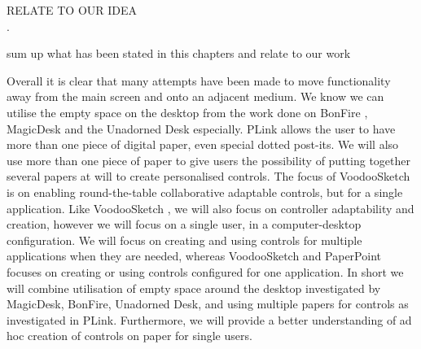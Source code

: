 RELATE TO OUR IDEA \\
.
\par






sum up what has been stated in this chapters and relate to our work


Overall it is clear that many attempts have been made to move functionality away from the main screen and onto an adjacent medium. We know we can utilise the empty space on the desktop from the work done on BonFire \cite{kane2009bonfire}, MagicDesk \cite{bi2011magic} and the Unadorned Desk \cite{hausen2012unadorned} especially. PLink \cite{steimle2011plink} allows the user to have more than one piece of digital paper, even special dotted post-its. We will also use more than one piece of paper to give users the possibility of putting together several papers at will to create personalised controls. The focus of VoodooSketch \cite{Block:2008:VEI:1347390.1347404} is on enabling round-the-table collaborative adaptable controls, but for a single application. Like VoodooSketch , we will also focus on controller adaptability and creation, however we will focus on a single user, in a computer-desktop configuration. We will focus on creating and using controls for multiple applications when they are needed, whereas VoodooSketch and PaperPoint \cite{Signer:2007:PPP:1226969.1226981} focuses on creating or using controls configured for one application. In short we will combine utilisation of empty space around the desktop investigated by MagicDesk, BonFire, Unadorned Desk, and using multiple papers for controls as investigated in PLink. Furthermore, we will provide a better understanding of ad hoc creation of controls on paper for single users.

